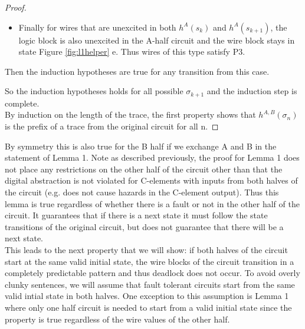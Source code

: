 \documentclass[12pt]{report}
\begin{document}
\begin{proof}
\begin{itemize}
\begin{itemize}
\item
Finally for wires that are unexcited in both $h^A(s_k)$ and $h^A(s_{k+1})$, the logic block is also unexcited in the A-half circuit and the wire block stays in state Figure \ref{fig:l1helper} e.  Thus wires of this type satisfy P3.
\end{itemize}
Then the induction hypotheses are true for any transition from this case. 
\end{itemize}
So the induction hypotheses holds for all possible $\sigma_{k+1}$ and the induction step is complete. \\
By induction on the length of the trace, the first property shows that $h^{A,B}(\sigma_n)$ is the prefix of a trace from the original circuit for all n.


\end{proof}
By symmetry this is also true for the B half if we exchange A and B in the statement of Lemma 1.  
Note as described previously, the proof for Lemma 1 does not place any restrictions on the other half of the circuit other than that the digital abstraction is not violated for C-elements with inputs from both halves of the circuit (e.g. does not cause hazards in the C-element output).  Thus this lemma is true regardless of whether there is a fault or not in the other half of the circuit.  It guarantees that if there is a next state it must follow the state transitions of the original circuit, but does not guarantee that there will be a next state.\\  %

This leads to the next property that we will show: if both halves of the circuit start at the same valid initial state, the wire blocks of the circuit transition in a completely predictable pattern and thus deadlock does not occur.
To avoid overly clunky sentences, we will assume that fault tolerant circuits start from the same valid intial state in both halves.  One exception to this assumption is Lemma 1 where only one half circuit is needed to start from a valid initial state since the property is true regardless of the wire values of the other half.
\end{document}
